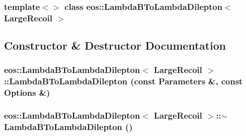\subsubsection*{template$<$$>$ class eos::LambdaBToLambdaDilepton$<$ LargeRecoil $>$}



\subsection{Constructor \& Destructor Documentation}
\hypertarget{classeos_1_1LambdaBToLambdaDilepton_3_01LargeRecoil_01_4_a4856b87a348441b6af74a3d8a3e9399e}{
\subsubsection[{LambdaBToLambdaDilepton}]{\setlength{\rightskip}{0pt plus 5cm}eos::LambdaBToLambdaDilepton$<$ {\bf LargeRecoil} $>$::LambdaBToLambdaDilepton (const {\bf Parameters} \&, \/  const {\bf Options} \&)}}
\label{classeos_1_1LambdaBToLambdaDilepton_3_01LargeRecoil_01_4_a4856b87a348441b6af74a3d8a3e9399e}
\hypertarget{classeos_1_1LambdaBToLambdaDilepton_3_01LargeRecoil_01_4_a561469823727e477359bfc10325cc56d}{
\subsubsection[{$\sim$LambdaBToLambdaDilepton}]{\setlength{\rightskip}{0pt plus 5cm}eos::LambdaBToLambdaDilepton$<$ {\bf LargeRecoil} $>$::$\sim$LambdaBToLambdaDilepton ()}}
\label{classeos_1_1LambdaBToLambdaDilepton_3_01LargeRecoil_01_4_a561469823727e477359bfc10325cc56d}



